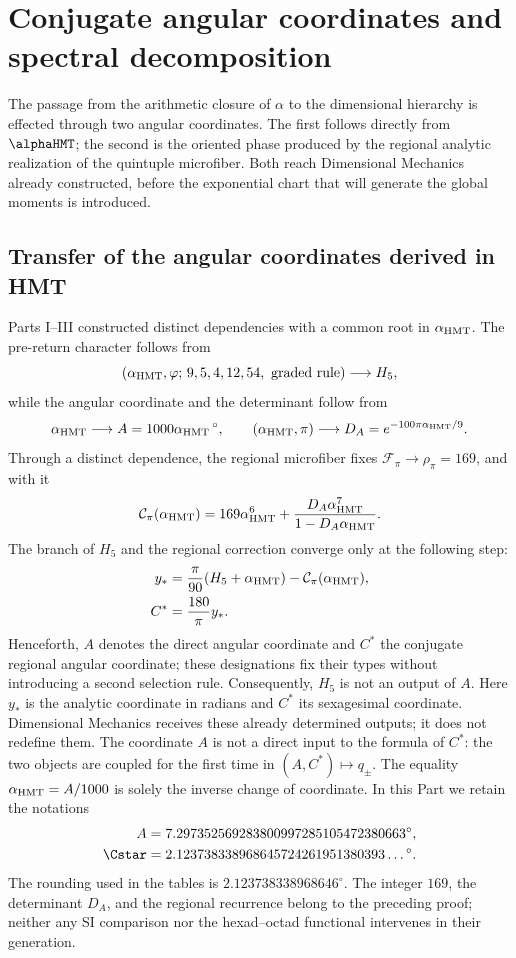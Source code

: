 \chapter{Conjugate angular coordinates and spectral decomposition}
\label{chap:canales}

The passage from the arithmetic closure of \(\alpha\) to the dimensional
hierarchy is effected through two angular coordinates. The first follows
directly from \(\alphaHMT\); the second is the oriented phase produced by
the regional analytic realization of the quintuple microfiber. Both reach
Dimensional Mechanics already constructed, before the exponential chart
that will generate the global moments is introduced.

\section{Transfer of the angular coordinates derived in HMT}

Parts I--III constructed distinct dependencies with a common root in
\(\alpha_{\rm HMT}\). The pre-return character follows from
\[
(\alpha_{\rm HMT},\varphi;\,9,5,4,12,54,\text{ graded rule})
\longrightarrow H_5,
\]
while the angular coordinate and the determinant follow from
\[
\alpha_{\rm HMT}\longrightarrow
A=1000\alpha_{\rm HMT}\,{}^\circ,
\qquad
(\alpha_{\rm HMT},\pi)\longrightarrow
D_A=e^{-100\pi\alpha_{\rm HMT}/9}.
\]
Through a distinct dependence, the regional microfiber fixes
\(\mathcal F_\pi\to\rho_\pi=169\), and with it
\[
\mathcal C_\pi(\alpha_{\rm HMT})
=169\alpha_{\rm HMT}^{6}
+\frac{D_A\alpha_{\rm HMT}^{7}}
       {1-D_A\alpha_{\rm HMT}}.
\]
The branch of \(H_5\) and the regional correction converge only at the
following step:
\[
\begin{aligned}
y_*&=\frac{\pi}{90}(H_5+\alpha_{\rm HMT})
     -\mathcal C_\pi(\alpha_{\rm HMT}),\\
C^*&=\frac{180}{\pi}y_*.
\end{aligned}
\]
Henceforth, \(A\) denotes the direct angular coordinate and \(C^*\) the
conjugate regional angular coordinate; these designations fix their types
without introducing a second selection rule.
Consequently, \(H_5\) is not an output of \(A\). Here \(y_*\) is the analytic
coordinate in radians and \(C^*\) its sexagesimal coordinate. Dimensional
Mechanics receives these already determined outputs; it does not redefine them.
The coordinate \(A\) is not a direct input to the formula of \(C^*\): the two
objects are coupled for the first time in \((A,C^*)\mapsto q_\pm\). The equality
\(\alpha_{\rm HMT}=A/1000\) is solely the inverse change of coordinate.
In this Part we retain the notations
\[
\begin{aligned}
 A&=7.297352569283800997285105472380663^\circ,\\
 \Cstar&=2.123738338968645724261951380393\ldots{}^\circ.
\end{aligned}
\]
The rounding used in the tables is
\(2.123738338968646^\circ\). The integer \(169\), the determinant \(D_A\), and
the regional recurrence belong to the preceding proof; neither any
SI comparison nor the hexad--octad functional intervenes in their generation.

